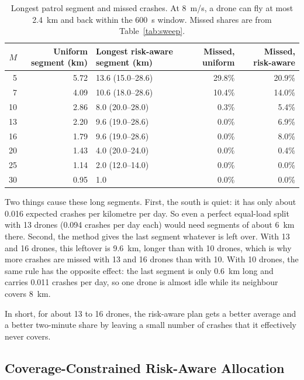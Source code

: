 \documentclass[11pt]{article}
\begin{document}
\begin{table}[htbp]
\centering
\caption{Longest patrol segment and missed crashes. At 8~m/s, a drone can fly
at most 2.4~km and back within the 600~s window. Missed shares are from
Table~\ref{tab:sweep}.}
\label{tab:longest}
\small
\begin{tabular}{@{}rrlrr@{}}
\toprule
$M$ & \textbf{Uniform segment (km)} & \textbf{Longest risk-aware segment (km)} & \textbf{Missed, uniform} & \textbf{Missed, risk-aware} \\
\midrule
5  & 5.72 & 13.6 (15.0--28.6) & 29.8\% & 20.9\% \\
7  & 4.09 & 10.6 (18.0--28.6) & 10.4\% & 14.0\% \\
10 & 2.86 & 8.0 (20.0--28.0)  & 0.3\%  & 5.4\%  \\
13 & 2.20 & 9.6 (19.0--28.6)  & 0.0\%  & 6.9\%  \\
16 & 1.79 & 9.6 (19.0--28.6)  & 0.0\%  & 8.0\%  \\
20 & 1.43 & 4.0 (20.0--24.0)  & 0.0\%  & 0.4\%  \\
25 & 1.14 & 2.0 (12.0--14.0)  & 0.0\%  & 0.0\%  \\
30 & 0.95 & 1.0               & 0.0\%  & 0.0\%  \\
\bottomrule
\end{tabular}
\end{table}

Two things cause these long segments. First, the south is quiet: it has only
about 0.016 expected crashes per kilometre per day. So even a perfect
equal-load split with 13 drones (0.094 crashes per day each) would need
segments of about 6~km there. Second, the method gives the last segment
whatever is left over. With 13 and 16 drones, this leftover is 9.6~km, longer
than with 10 drones, which is why more crashes are missed with 13 and 16 drones
than with 10. With 10 drones, the same rule has the opposite effect: the last
segment is only 0.6~km long and carries 0.011 crashes per day, so one drone is
almost idle while its neighbour covers 8~km.

In short, for about 13 to 16 drones, the risk-aware plan gets a better average
and a better two-minute share by leaving a small number of crashes that it
effectively never covers.

\subsection{Coverage-Constrained Risk-Aware Allocation}
\label{sec:ccr_results}
\end{document}

